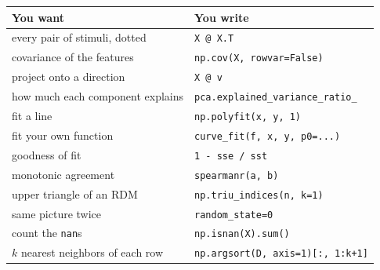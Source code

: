\documentclass[11pt]{article}
\begin{document}
\begin{center}
\begin{tabular}{@{}p{}p{}@{}}
\toprule
\textbf{You want} & \textbf{You write} \\
\midrule
every pair of stimuli, dotted        & \texttt{X @ X.T} \\
covariance of the features           & \texttt{np.cov(X, rowvar=False)} \\
project onto a direction             & \texttt{X @ v} \\
how much each component explains     & \texttt{pca.explained\_variance\_ratio\_} \\
fit a line                           & \texttt{np.polyfit(x, y, 1)} \\
fit your own function                & \texttt{curve\_fit(f, x, y, p0=...)} \\
goodness of fit                      & \texttt{1 - sse / sst} \\
monotonic agreement                  & \texttt{spearmanr(a, b)} \\
upper triangle of an RDM             & \texttt{np.triu\_indices(n, k=1)} \\
same picture twice                   & \texttt{random\_state=0} \\
count the \texttt{nan}s              & \texttt{np.isnan(X).sum()} \\
$k$ nearest neighbors of each row    & \texttt{np.argsort(D, axis=1)[:, 1:k+1]} \\
\bottomrule
\end{tabular}
\end{center}
\end{document}
